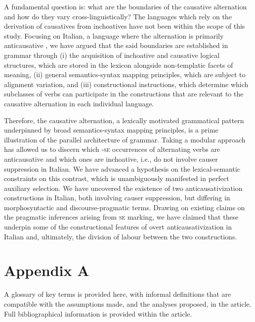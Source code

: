 \documentclass[output=paper,colorlinks,citecolor=brown
]{langscibook}
\begin{document}
A fundamental question is: what are the boundaries of the causative alternation and how do they vary cross-linguistically? The languages which rely on the derivation of causatives from inchoatives have not been within the scope of this study. Focusing on Italian, a language where the alternation is primarily anticausative \citep{haspelmath1993more}, we have argued that the said boundaries are established in grammar through (i) the acquisition of inchoative and causative logical structures, which are stored in the lexicon alongside non-templatic facets of meaning, (ii) general semantics-syntax mapping principles, which are subject to alignment variation, and (iii) constructional instructions, which determine which subclasses of verbs can participate in the constructions that are relevant to the causative alternation in each individual language.  

 Therefore, the causative alternation, a lexically motivated grammatical pattern underpinned by broad semantics-syntax mapping principles, is a prime illustration of the parallel architecture of grammar. Taking a modular approach has allowed us to discern which -\textsc{se} occurrences of alternating verbs are anticausative and which ones are inchoative, i.e., do not involve causer suppression in Italian. We have advanced a hypothesis on the lexical-semantic constraints on this contrast, which is unambiguously manifested in perfect auxiliary selection. We have uncovered the existence of two anticausativization constructions in Italian, both involving causer suppression, but differing in morphosyntactic and discourse-pragmatic terms. Drawing on existing claims on the pragmatic inferences arising from \textsc{se} marking, we have claimed that these underpin some of the constructional features of overt anticausativization in Italian and, ultimately, the division of labour between the two constructions. 

\section*{Appendix A}

A glossary of key terms is provided here, with informal definitions that are compatible with the assumptions made, and the analyses proposed, in the article. Full bibliographical information is provided within the article. 

\end{document}

